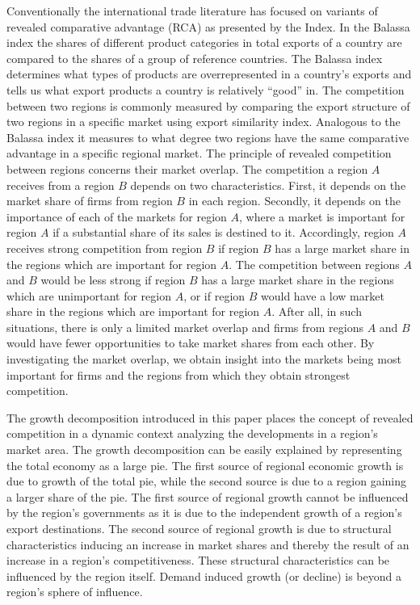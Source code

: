 \documentclass[11pt,parskip,abstracton,notitlepage, paper=a4]{scrartcl}
\begin{document}
Conventionally the international trade literature has focused on variants of revealed comparative advantage (RCA) as presented by the \citet{balassa1965trade} Index. In the Balassa index the shares of different product categories in total exports of a country are compared to the shares of a group of reference countries. The Balassa index determines what types of products are overrepresented in a country's exports and tells us what export products a country is relatively ``good'' in. The competition between two regions is commonly measured by comparing the export structure of two regions in a specific market using \citet{finger1979measure} export similarity index. Analogous to the Balassa index it measures to what degree two regions have the same comparative advantage in a specific regional market. The principle of revealed competition \citep{thissen2013regional} between regions concerns their market overlap. The competition a region $A$ receives from a region $B$ depends on two characteristics. First, it depends on the market share of firms from region $ B $ in each region. Secondly, it depends on the importance of each of the markets for region $ A $, where a market is important for region $ A $ if a substantial share of its sales is destined to it.  Accordingly, region $ A $ receives strong competition from region $ B $ if region $ B $ has a large market share in the regions which are important for region $ A $. The competition between regions $ A $ and $ B $ would be less strong if region $ B $ has a large market share in the regions which are unimportant for region $ A $, or if region $ B $ would have a low market share in the regions which are important for region $ A $. After all, in such situations, there is only a limited market overlap and firms from regions $ A $ and $ B $ would have fewer opportunities to take market shares from each other. By investigating the market overlap, we obtain insight into the markets being most important for firms and the regions from which they obtain strongest competition.

The growth decomposition introduced in this paper places the concept of revealed competition in a dynamic context analyzing the developments in a region's market area. The growth decomposition can be easily explained by representing the total economy as a large pie. The first source of regional economic growth is due to growth of the total pie, while the second source is due to a region gaining a larger share of the pie. The first source of regional growth cannot be influenced by the region's governments as it is due to the independent growth of a region's export destinations. The second source of regional growth is due to structural characteristics inducing an increase in market shares and thereby the result of an increase in a region's competitiveness. These structural characteristics can be influenced by the region itself. Demand induced growth (or decline) is beyond a region's sphere of influence.
\end{document}
